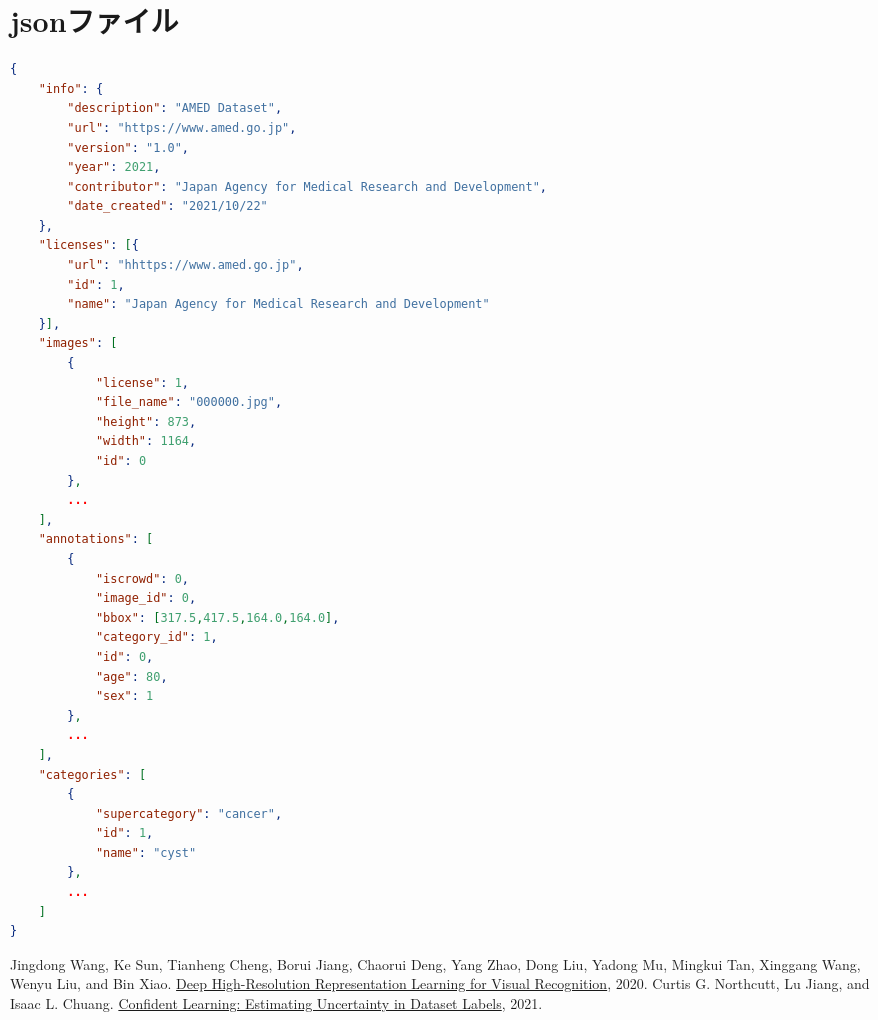\documentclass[a4j]{ujarticle}
\begin{document}
\clearpage

	\appendix
	\def\thesection{付録\Alph{section}}
	\section{jsonファイル}
	\label{sec:json}
	\begin{lstlisting}[language=json, caption={変換後のjsonファイル}, label=lst:json]
{
	"info": {
		"description": "AMED Dataset",
		"url": "https://www.amed.go.jp",
		"version": "1.0",
		"year": 2021,
		"contributor": "Japan Agency for Medical Research and Development",
		"date_created": "2021/10/22"
	},
	"licenses": [{
		"url": "hhttps://www.amed.go.jp",
		"id": 1,
		"name": "Japan Agency for Medical Research and Development"
	}],
	"images": [
		{
			"license": 1,
			"file_name": "000000.jpg",
			"height": 873,
			"width": 1164,
			"id": 0
		},
		...
	],
	"annotations": [
		{
			"iscrowd": 0,
			"image_id": 0,
			"bbox": [317.5,417.5,164.0,164.0],
			"category_id": 1,
			"id": 0,
			"age": 80,
			"sex": 1
		},
		...
	],
	"categories": [
		{
			"supercategory": "cancer",
			"id": 1,
			"name": "cyst"
		},
		...
	]
}
	\end{lstlisting}

	\begin{thebibliography}{9} 
		 Jingdong Wang, Ke Sun, Tianheng Cheng, Borui Jiang, Chaorui Deng, Yang Zhao, Dong Liu, Yadong Mu, Mingkui Tan, Xinggang Wang, Wenyu Liu, and Bin Xiao. \href{https://arxiv.org/pdf/1908.07919.pdf}{Deep High-Resolution Representation Learning for Visual Recognition}, 2020.
		 Curtis G. Northcutt, Lu Jiang, and Isaac L. Chuang. \href{https://arxiv.org/pdf/1911.00068.pdf}{Confident Learning: Estimating Uncertainty in Dataset Labels}, 2021.
	\end{thebibliography}
\end{document}
